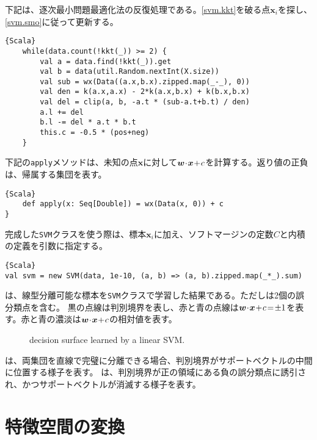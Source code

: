 \documentclass[10pt,a4paper]{book}
\begin{document}
下記は、逐次最小問題最適化法の反復処理である。\eqref{svm.kkt}を破る点$\bm{x}_i$を探し、\eqref{svm.smo}に従って更新する。

\begin{Verbatim}{Scala}
	while(data.count(!kkt(_)) >= 2) {
		val a = data.find(!kkt(_)).get
		val b = data(util.Random.nextInt(X.size))
		val sub = wx(Data((a.x,b.x).zipped.map(_-_), 0))
		val den = k(a.x,a.x) - 2*k(a.x,b.x) + k(b.x,b.x)
		val del = clip(a, b, -a.t * (sub-a.t+b.t) / den)
		a.l += del
		b.l -= del * a.t * b.t
		this.c = -0.5 * (pos+neg)
	}
\end{Verbatim}

下記の\texttt{apply}メソッドは、未知の点$\bm{x}$に対して$\bm{w}\! \cdot \!\bm{x}\!+\!c$を計算する。返り値の正負は、帰属する集団を表す。

\begin{Verbatim}{Scala}
	def apply(x: Seq[Double]) = wx(Data(x, 0)) + c
}
\end{Verbatim}

完成した\texttt{SVM}クラスを使う際は、標本$\bm{x}_i$に加え、ソフトマージンの定数$C$と内積の定義を引数に指定する。

\begin{Verbatim}{Scala}
val svm = new SVM(data, 1e-10, (a, b) => (a, b).zipped.map(_*_).sum)
\end{Verbatim}

は、線型分離可能な標本を\texttt{SVM}クラスで学習した結果である。ただしは2個の誤分類点を含む。
黒の点線は判別境界を表し、赤と青の点線は$\bm{w}\! \cdot \!\bm{x}\!+\!c\!=\!\pm1$を表す。赤と青の濃淡は$\bm{w}\! \cdot \!\bm{x}\!+\!c$の相対値を表す。

\begin{figure}[h]
\centering
{}
\caption{decision surface learned by a linear SVM.\label{fig:svm.line}}
\end{figure}

は、両集団を直線で完璧に分離できる場合、判別境界がサポートベクトルの中間に位置する様子を表す。
は、判別境界が正の領域にある負の誤分類点に誘引され、かつサポートベクトルが消滅する様子を表す。

\section{特徴空間の変換\label{sect:svm.kern}}
\end{document}
